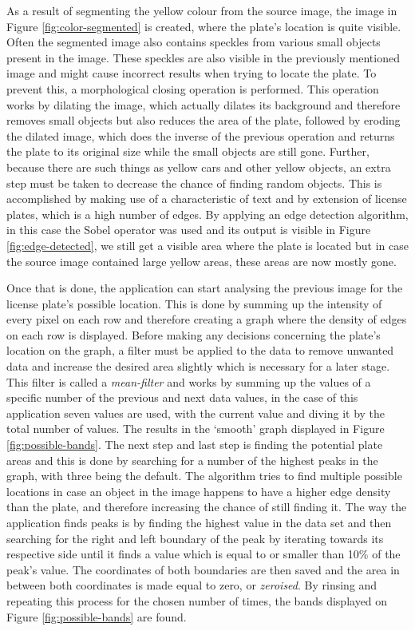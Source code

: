As a result of segmenting the yellow colour from the source image, the image in Figure \ref{fig:color-segmented} is created, where the plate's location is quite visible. Often the segmented image also contains speckles from various small objects present in the image. These speckles are also visible in the previously mentioned image and might cause incorrect results when trying to locate the plate. To prevent this, a morphological closing operation \cite{morphclose} is performed. This operation works by dilating the image, which actually dilates its background and therefore removes small objects but also reduces the area of the plate, followed by eroding the dilated image, which does the inverse of the previous operation and returns the plate to its original size while the small objects are still gone. Further, because there are such things as yellow cars and other yellow objects, an extra step must be taken to decrease the chance of finding random objects. This is accomplished by making use of a characteristic of text and by extension of license plates, which is a high number of edges. By applying an edge detection algorithm, in this case the Sobel operator \cite{sobel} was used and its output is visible in Figure \ref{fig:edge-detected}, we still get a visible area where the plate is located but in case the source image contained large yellow areas, these areas are now mostly gone.

Once that is done, the application can start analysing the previous image for the license plate's possible location. This is done by summing up the intensity of every pixel on each row and therefore creating a graph where the density of edges on each row is displayed. Before making any decisions concerning the plate's location on the graph, a filter must be applied to the data to remove unwanted data and increase the desired area slightly which is necessary for a later stage. This filter is called a \emph{mean-filter} and works by summing up the values of a specific number of the previous and next data values, in the case of this application seven values are used, with the current value and diving it by the total number of values. The results in the `smooth' graph displayed in Figure \ref{fig:possible-bands}. The next step and last step is finding the potential plate areas and this is done by searching for a number of the highest peaks in the graph, with three being the default. The algorithm tries to find multiple possible locations in case an object in the image happens to have a higher edge density than the plate, and therefore increasing the chance of still finding it. The way the application finds peaks is by finding the highest value in the data set and then searching for the right and left boundary of the peak by iterating towards its respective side until it finds a value which is equal to or smaller than 10\% of the peak's value. The coordinates of both boundaries are then saved and the area in between both coordinates is made equal to zero, or \emph{zeroised}. By rinsing and repeating this process for the chosen number of times, the bands displayed on Figure \ref{fig:possible-bands} are found. 

